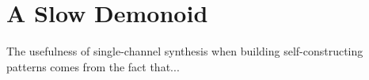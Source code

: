 

\section{A Slow Demonoid}\label{sec:demonoid}

The usefulness of single-channel synthesis when building self-constructing patterns comes from the fact that...


